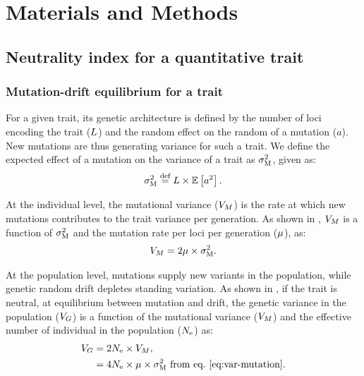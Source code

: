 \documentclass{article}
\begin{document}
\section{Materials and Methods}\label{sec:materials-and-methods}
\subsection{Neutrality index for a quantitative trait}\label{subsec:neutrality-index-for-a-quantitative-trait}
\subsubsection{Mutation-drift equilibrium for a trait}

For a given trait, its genetic architecture is defined by the number of loci encoding the trait ($L$) and the random effect on the random of a mutation ($a$).
New mutations are thus generating variance for such a trait.
We define the expected effect of a mutation on the variance of a trait as $\sigma^2_{\text{M}}$, given as:
\begin{gather}
    \sigma^2_{\text{M}} \stackrel{\text{def}}{=} L \times \operatorname{\mathbb{E}} \left[ a^2 \right]. \label{eq:rate-mut}
\end{gather}

At the individual level, the mutational variance ($V_{M}$) is the rate at which new mutations contributes to the trait variance per generation.
As shown in \textcite{lande_quantitative_1979, lande_sexual_1980}, $V_{M}$ is a function of $\sigma^2_{\text{M}}$ and the mutation rate per loci per generation ($\mu$), as:
\begin{gather}
    V_{M} = 2 \mu \times \sigma^2_{\text{M}} \label{eq:var-mutation}.
\end{gather}

At the population level, mutations supply new variants in the population, while genetic random drift depletes standing variation.
As shown in \textcite{lynch_mutation_1998}, if the trait is neutral, at equilibrium between mutation and drift, the genetic variance in the population ($V_{G}$) is a function of the mutational variance ($V_{M}$) and the effective number of individual in the population ($N_{\text{e}}$) as:
\begin{align}
    V_{G} & =  2 N_{\text{e}} \times V_{M}, \\
    & = 4 N_{\text{e}} \times \mu \times \sigma^2_{\text{M}} \text{ from eq.~\ref{eq:var-mutation}}\label{eq:var-genetic}.
\end{align}
\end{document}
